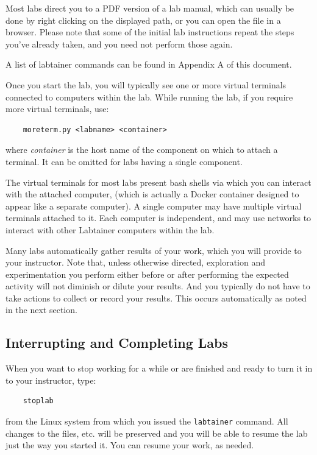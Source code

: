 \documentclass[12pt]{article}
\begin{document}
Most labs direct you to a PDF version of a lab manual, which can usually 
be done by right clicking on the displayed path, or you can open the file in a browser.
Please note that some of the initial lab instructions repeat the steps you've already taken, and you need
not perform those again. 

A list of labtainer commands can be found in Appendix A of this document. 

Once you start the lab, you will typically see one or more virtual terminals connected to computers within
the lab.  While running the lab, if you require more virtual terminals, use:
\begin{verbatim}
    moreterm.py <labname> <container>
\end{verbatim}
\noindent where \textit{container} is the host name of the component on which to attach a terminal.  
It can be omitted for labs having a single component.

The virtual terminals for most labs present bash shells via which you can interact
with the attached computer, (which is actually a Docker container designed to appear
like a separate computer).  A single computer
may have multiple virtual terminals attached to it.  Each computer is independent, and 
may use networks to interact with other Labtainer computers within the lab.  

Many labs automatically gather results of your work, which you will provide to your instructor.
Note that, unless otherwise directed, exploration and experimentation you perform either before
or after performing the expected activity will not diminish or dilute your results.  And you typically
do not have to take actions to collect or record your results.  This occurs automatically as noted in the next section.  

\subsection{Interrupting and Completing  Labs}
When you want to stop working for a while or are finished and ready to turn it in to your instructor, type:
\begin{verbatim}
    stoplab
\end{verbatim}

\noindent from the Linux system from which you issued the {\tt labtainer} command. All changes to the files, etc. will be preserved and you will be able to resume the lab just the way you started it. You can resume your work, as needed.
\end{document}
